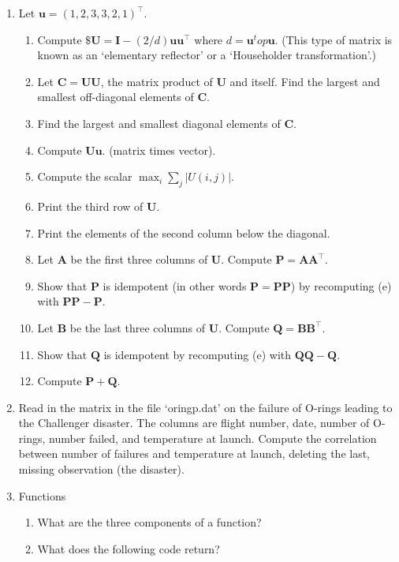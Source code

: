 \documentclass[12pt]{report}
\newcommand{\Vec}[1]{\bm{#1}}
\begin{document}
\begin{enumerate}
\item Let $\Vec{u} = (1, 2, 3, 3, 2, 1)^\top$.  
    \begin{enumerate}[label={\alph*}]
        \item Compute $\$\Vec{U} = \Vec{I} - (2/d) \Vec{u} \Vec{u}^\top$ where $d = \Vec{u}^top \Vec{u}$.  (This type of matrix is known as an `elementary reflector' or a `Householder transformation'.)
        \item Let $\Vec{C} = \Vec{U}  \Vec{U}$, the matrix product of $\Vec{U}$ and itself.  Find the largest and smallest off-diagonal elements of $\Vec{C}$.
        \item Find the largest and smallest diagonal elements of $\Vec{C}$.
        \item Compute $\Vec{U} \Vec{u}$.  (matrix times vector).
        \item Compute the scalar $\max_i \sum_j |U(i, j)| $.
        \item Print the third row of $\Vec{U}$.
        \item Print the elements of the second column below the diagonal.
        \item Let $\Vec{A}$ be the first three columns of $\Vec{U}$.  Compute $\Vec{P} = \Vec{A} \Vec{A}^\top$.
        \item Show that $\Vec{P}$ is idempotent (in other words $\Vec{P} = \Vec{P}\Vec{P}$) by recomputing (e) with $\Vec{P}\Vec{P} - \Vec{P}$.
        \item Let $\Vec{B}$ be the last three columns of $\Vec{U}$.  Compute $\Vec{Q} = \Vec{B}\Vec{B}^\top$.
        \item Show that $\Vec{Q}$ is idempotent by recomputing (e) with $\Vec{Q} \Vec{Q} - \Vec{Q}$.
        \item Compute $\Vec{P} + \Vec{Q}$.
    \end{enumerate}
    
\item Read in the matrix in the file `oringp.dat' on the failure of O-rings leading to the Challenger disaster.
The columns are flight number, date, number of O-rings, number failed, and temperature at launch.
Compute the correlation between number of failures and temperature at launch, deleting the last, missing observation (the disaster).

\item Functions
    \begin{enumerate}[label={\alph*}]
        \item What are the three components of a function?
        \item What does the following code return?


\end{enumerate}
\end{enumerate}
\end{document}

